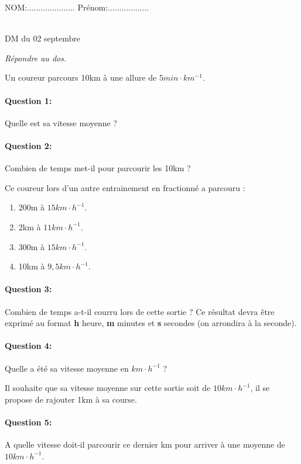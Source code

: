 \documentclass[a5paper,12pt,norsk]{article}
\begin{document}
\thispagestyle{empty}
NOM:..................... Prénom:..................\\
~\ \\
\begin{center}
   {DM du 02 septembre}
\end{center}

\textit{Répondre au dos.}

Un coureur parcours 10km à une allure de $5min\cdot km^{-1}$.

\paragraph{Question 1:} Quelle est sa vitesse moyenne ? %

\paragraph{Question 2:} Combien de temps met-il pour parcourir les 10km ? %

Ce coureur lors d'un autre entrainement en fractionné a parcouru :
\begin{enumerate}
 \item 200m à  $15km\cdot h^{-1}$.
 \item 2km à  $11km\cdot h^{-1}$.
 \item 300m à  $15km\cdot h^{-1}$.
 \item 10km  à  $9,5km\cdot h^{-1}$.
\end{enumerate}

\paragraph{Question 3:} Combien de temps a-t-il courru lors de cette sortie ? Ce résultat devra être exprimé au format \textbf{h} heure, \textbf{m} minutes et \textbf{s} secondes (on arrondira à la seconde). %

\paragraph{Question 4:} Quelle a été sa vitesse moyenne en $km\cdot h^{-1}$ ? %

Il souhaite que sa vitesse moyenne sur cette sortie soit de $10km\cdot h^{-1}$, il se propose de rajouter 1km à sa course.

\paragraph{Question 5:} A quelle vitesse doit-il parcourir ce dernier km pour arriver à une moyenne de $10km\cdot h^{-1}$.

\end{document}
